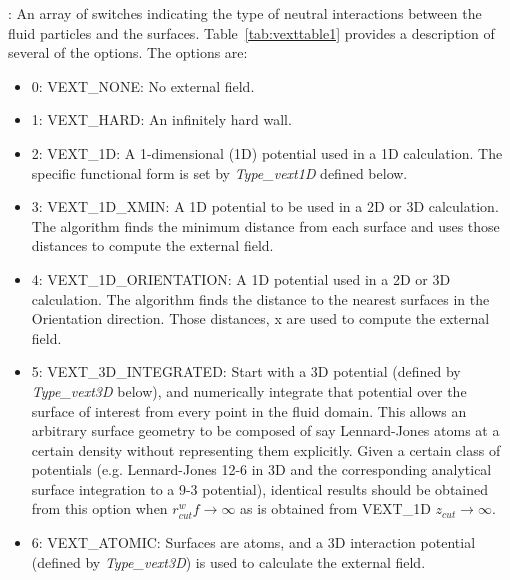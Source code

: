 \documentclass[10pt,onecolumn]{article}
\begin{document}

\vspace{0.1in}
\vspace{0.1in}
:  An array of switches indicating the type of neutral
interactions between the fluid particles and the surfaces.  Table~\ref{tab:vexttable1} provides
a description of several of the options.  The options
are:
\begin{itemize}
\item {0: VEXT\_NONE: No external field.}
\item {1: VEXT\_HARD: An infinitely hard wall.}
\item {2: VEXT\_1D: A 1-dimensional (1D) potential used in a 1D calculation.  The specific
functional form is set by {\it Type\_vext1D} defined below.}
\item {3: VEXT\_1D\_XMIN: A 1D potential to be used in a 2D or 3D calculation.  The algorithm finds the minimum distance from each surface and uses those distances to compute the external field.}
\item {4: VEXT\_1D\_ORIENTATION: A 1D potential used in a 2D or 3D calculation.  The algorithm
finds the distance to the nearest surfaces in the Orientation direction.
Those distances, x are used to compute the external field.}
\item{5: VEXT\_3D\_INTEGRATED:  Start with a 3D potential (defined by {\it Type\_vext3D} below), and 
numerically integrate that potential over the surface of interest from every point in the fluid domain.  This allows an arbitrary surface geometry to be composed of say Lennard-Jones atoms at a certain density without representing them explicitly.  Given a certain class of potentials (e.g. Lennard-Jones 12-6
in 3D and the corresponding analytical surface integration to a 9-3 potential), identical results
should be obtained from this option when $r_{cut}^wf\to \infty$ as is obtained from VEXT\_1D
$z_{cut}\to \infty$.}
\item{6: VEXT\_ATOMIC:  Surfaces are atoms, and a 3D interaction potential (defined by
{\it Type\_vext3D}) is used to calculate the external field.}
\end{itemize}
\end{document}
